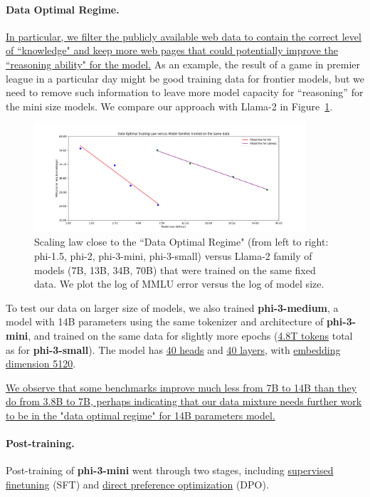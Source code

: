 \documentclass[11pt]{article}
\begin{document}
\paragraph{Data Optimal Regime.} \uline{In particular, we filter the publicly available web data to contain the correct level of ``knowledge" and keep more web pages that could potentially improve the ``reasoning ability" for the model.} As an example, the result of a game in premier league in a particular day might be good training data for frontier models, but we need to remove such information to leave more model capacity for ``reasoning'' for the mini size models. We compare our approach with Llama-2 in Figure~\ref{fig:enter-label}.

\begin{figure}
    \centering
    \includegraphics[width=0.9\textwidth]{scaling.png}
    \caption{Scaling law close to the ``Data Optimal Regime" (from left to right: phi-1.5, phi-2, phi-3-mini, phi-3-small) versus Llama-2 family of models (7B, 13B, 34B, 70B) that were trained on the same fixed data. We plot the log of MMLU error versus the log of model size.}
    \label{fig:enter-label}
\end{figure}

To test our data on larger size of models, we also trained \textbf{phi-3-medium}, a model with 14B parameters using the same tokenizer and architecture of \textbf{phi-3-mini}, and trained on the same data for slightly more epochs (\uline{4.8T tokens} total as for \textbf{phi-3-small}). The model has \uline{40 heads} and \uline{40 layers}, with \uline{embedding dimension 5120}.

\uline{We observe that some benchmarks improve much less from 7B to 14B than they do from 3.8B to 7B, perhaps indicating that our data mixture needs further work to be in the "data optimal regime" for 14B parameters model.}

\paragraph{Post-training.}
Post-training of \textbf{phi-3-mini} went through two stages, including \uline{supervised finetuning} (SFT) and \uline{direct preference  optimization} (DPO).
\end{document}
